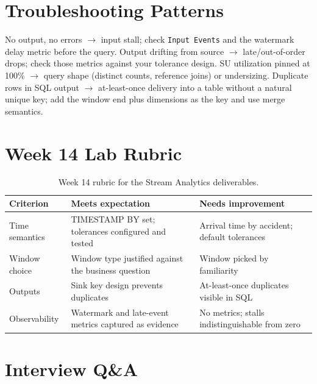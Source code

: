 \section{Troubleshooting Patterns}
No output, no errors $\rightarrow$ input stall; check \texttt{Input Events} and the watermark delay metric before the query. Output drifting from source $\rightarrow$ late/out-of-order drops; check those metrics against your tolerance design. SU utilization pinned at 100\% $\rightarrow$ query shape (distinct counts, reference joins) or undersizing. Duplicate rows in SQL output $\rightarrow$ at-least-once delivery into a table without a natural unique key; add the window end plus dimensions as the key and use merge semantics.

\section{Week 14 Lab Rubric}
\begin{table}[H]
\centering
\small
\begin{tabular}{@{}p{3.2cm}p{5.0cm}p{5.0cm}@{}}
\toprule
\textbf{Criterion} & \textbf{Meets expectation} & \textbf{Needs improvement} \\
\midrule
Time semantics & TIMESTAMP BY set; tolerances configured and tested & Arrival time by accident; default tolerances \\
Window choice & Window type justified against the business question & Window picked by familiarity \\
Outputs & Sink key design prevents duplicates & At-least-once duplicates visible in SQL \\
Observability & Watermark and late-event metrics captured as evidence & No metrics; stalls indistinguishable from zero \\
\bottomrule
\end{tabular}
\caption{Week 14 rubric for the Stream Analytics deliverables.}
\label{tab:ch14-rubric}
\end{table}

\section{Interview Q\&A}
